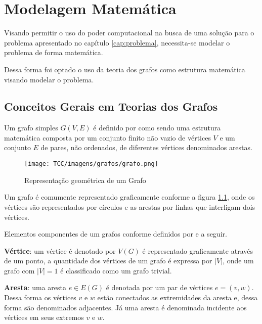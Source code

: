 \chapter{Modelagem Matemática}
\pagestyle{simple}
\label{cap:modelagem}

Visando permitir o uso do poder computacional na busca de uma solução para o problema apresentado no capítulo \ref{cap:problema}, necessita-se modelar o problema de forma matemática.

Dessa forma foi optado o uso da teoria dos grafos como estrutura matemática visando modelar o problema.

\section{Conceitos Gerais em Teorias dos Grafos}

Um grafo simples $G(V,E)$ é definido por  como sendo uma estrutura matemática composta por um conjunto finito não vazio de vértices $V$ e um conjunto $E$ de pares, não ordenados, de diferentes vértices denominados arestas.

\begin{figure}[H]
     \centering
     \texttt{[image: TCC/imagens/grafos/grafo.png]}
     \caption{Representação geométrica de um Grafo}
     \label{Representação geométrica de um grafo}
\end{figure}


Um grafo é comumente representado graficamente conforme a figura \ref{Representação geométrica de um grafo}, onde os vértices são representados por círculos e as arestas por linhas que interligam dois vértices.

Elementos componentes de um grafos conforme definidos por  e  a seguir.


\begin{definition} 
 \textbf{Vértice}: um vértice é denotado por $V(G)$ é representado graficamente através de um ponto, a quantidade dos vértices de um grafo é expressa por $|V|$, onde um grafo com $|V| = 1$ é classificado como um grafo trivial.
 \end{definition}

\begin{definition} 
\textbf{Aresta}: uma aresta $e \in E(G)$ é denotada por um par de vértices $e = (v,w)$. Dessa forma os vértices $v$ e $w$ estão conectados as extremidades da aresta e, dessa forma são denominados adjacentes. Já uma aresta é denominada incidente aos vértices em seus extremos $v$ e $w$.
\end{definition}

